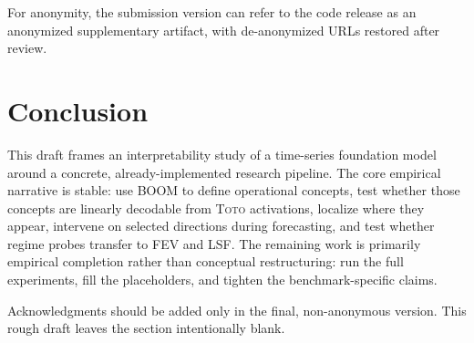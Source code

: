 \documentclass{article}
\newcommand{\model}{\textsc{Toto}}
\newcommand{\boom}{\textsc{BOOM}}
\newcommand{\fev}{\textsc{FEV}}
\newcommand{\lsf}{\textsc{LSF}}
\begin{document}
For anonymity, the submission version can refer to the code release as an anonymized supplementary artifact, with de-anonymized URLs restored after review.

\section{Conclusion}

This draft frames an interpretability study of a time-series foundation model around a concrete, already-implemented research pipeline. The core empirical narrative is stable: use \boom{} to define operational concepts, test whether those concepts are linearly decodable from \model{} activations, localize where they appear, intervene on selected directions during forecasting, and test whether regime probes transfer to \fev{} and \lsf{}. The remaining work is primarily empirical completion rather than conceptual restructuring: run the full experiments, fill the placeholders, and tighten the benchmark-specific claims.

\begin{ack}
Acknowledgments should be added only in the final, non-anonymous version. This rough draft leaves the section intentionally blank.
\end{ack}



\end{document}
